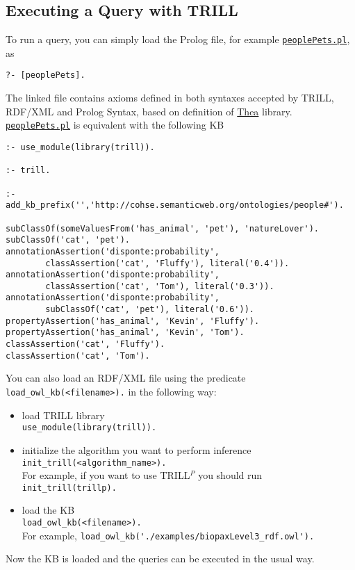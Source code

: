 \documentclass[a4paper,10pt]{scrartcl}
\begin{document}
\subsection{Executing a Query with TRILL}
To run a query, you can simply load the Prolog file, for example \href{http://trill.lamping.unife.it/example/trill/peoplePets.pl}{\texttt{peoplePets.pl}}, as
\begin{verbatim}
?- [peoplePets].
\end{verbatim}
\noindent
The linked file contains axioms defined in both syntaxes accepted by TRILL, RDF/XML and Prolog Syntax, based on definition of \href{http://vangelisv.github.io/thea/}{Thea} library.
\href{http://trill.lamping.unife.it/example/trill/peoplePets.pl}{\texttt{peoplePets.pl}} is equivalent with the following KB
\begin{verbatim}
:- use_module(library(trill)).

:- trill.

:- add_kb_prefix('','http://cohse.semanticweb.org/ontologies/people#').

subClassOf(someValuesFrom('has_animal', 'pet'), 'natureLover').
subClassOf('cat', 'pet').
annotationAssertion('disponte:probability', 
        classAssertion('cat', 'Fluffy'), literal('0.4')).
annotationAssertion('disponte:probability', 
        classAssertion('cat', 'Tom'), literal('0.3')).
annotationAssertion('disponte:probability', 
        subClassOf('cat', 'pet'), literal('0.6')).
propertyAssertion('has_animal', 'Kevin', 'Fluffy').
propertyAssertion('has_animal', 'Kevin', 'Tom').
classAssertion('cat', 'Fluffy').
classAssertion('cat', 'Tom').
\end{verbatim}
\noindent


You can also load an RDF/XML file using the predicate \verb|load_owl_kb(<filename>).| in the following way:
\begin{itemize}
	\item load TRILL library\\
	\verb|use_module(library(trill)).|
	\item initialize the algorithm you want to perform inference\\
	\verb|init_trill(<algorithm_name>).|\\
	For example, if you want to use TRILL$^P$ you should run \verb|init_trill(trillp).|
	\item load the KB\\
	\verb|load_owl_kb(<filename>).|\\
	For example, \verb|load_owl_kb('./examples/biopaxLevel3_rdf.owl').|
\end{itemize}
\noindent
Now the KB is loaded and the queries can be executed in the usual way.
\end{document}
